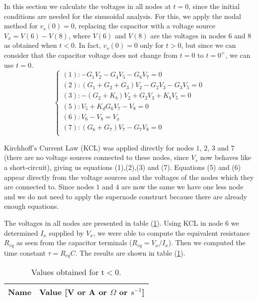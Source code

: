 In this section we calculate the voltages in all nodes at $t=0$, since the initial conditions are needed for the sinusoidal analysis. For this, we apply the nodal method for $v_{s}\left(0\right)=0$, replacing the capacitor with a voltage source $V_{x} = V\left(6\right)-V\left(8\right)$, where $V\left(6\right)$ and $V\left(8\right)$ are the voltages in nodes $6$ and $8$ as obtained when $t<0$. In fact, $v_{s}\left(0\right)=0$ only for $t>0$, but since we can consider that the capacitor voltage does not change from $t=0$ to $t=0^{+}$, we can use $t=0$.
\begin{equation}
  \begin{cases}
    \left(1\right): -G_{1}V_{2}-G_{4}V_{5}-G_{6}V_{7}=0                         \\
    \left(2\right): \left(G_{1}+G_{2}+G_{3}\right)V_{2}-G_{2}V_{3}-G_{3}V_{5}=0 \\
    \left(3\right): -\left(G_{2}+K_{b}\right)V_{2}+G_{2}V_{3}+K_{b}V_{5}=0      \\
    \left(5\right): V_{5}+K_{d}G_{6}V_{7}-V_{8}=0                               \\
    \left(6\right): V_{6}-V_{8}=V_{x}                                           \\
    \left(7\right): \left(G_{6}+G_{7}\right)V_{7}-G_{7}V_{8}=0                  \\
  \end{cases}
\end{equation}

Kirchhoff's Current Law (KCL) was applied directly for nodes $1$, $2$, $3$ and $7$ 
(there are no voltage sources connected to these nodes, since $V_{s}$ 
now behaves like a short-circuit), giving us equations (1),(2),(3) and (7).
 Equations (5) and (6) appear directly from the voltage sources 
  and the voltages of the nodes which they are connected to. 
  Since nodes $1$ and $4$ are now the same we have one less
   node and we do not need to apply the supernode construct because there are already enough equations.

The voltages in all nodes are presented in table (\ref{tab:2}).
Using KCL in node $6$ we determined $I_{x}$ supplied by $V_{x}$,
we were able to compute the equivalent resistance $R_{eq}$ as 
seen from the capacitor terminals ($R_{eq}=V_{x}/I_{x}$). 
Then we computed the time constant $\tau=R_{eq}C$. The results are shown in table (\ref{tab:2}). 


\begin{table}[h]
  \centering
  \begin{tabular}{|l|r|}
    \hline
    {\bf Name} & {\bf Value [V or A or $\Omega$ or $s^{-1}$]} \\ \hline
    
  \end{tabular}
  \caption{Values obtained for t$<$0.}
  \label{tab:2}
\end{table}

